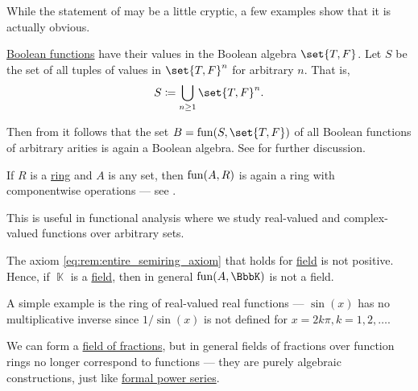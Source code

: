 \begin{example}\label{ex:thm:functions_over_model_of_positive_formulas_form_model}
  While the statement of  may be a little cryptic, a few examples show that it is actually obvious.
  \begin{itemize}
     \hyperref[def:boolean_function]{Boolean functions} have their values in the Boolean algebra \( \set{ T, F } \). Let \( S \) be the set of all tuples of values in \( \set{ T, F }^n \) for arbitrary \( n \). That is,
    \begin{equation*}
      S \coloneqq \bigcup_{n \geq 1} \set{ T, F }^n.
    \end{equation*}

    Then from  it follows that the set \( B = \fun(S, \set{ T, F }) \) of all Boolean functions of arbitrary arities is again a Boolean algebra. See  for further discussion.

     If \( R \) is a \hyperref[def:ring]{ring} and \( A \) is any set, then \( \operatorname{fun}(A, R) \) is again a ring with componentwise operations --- see .

    This is useful in functional analysis where we study real-valued and complex-valued functions over arbitrary sets.

     The axiom \eqref{eq:rem:entire_semiring_axiom} that holds for  \hyperref[def:field]{field} is not positive. Hence, if \( \BbbK \) is a \hyperref[def:field]{field}, then in general \( \fun(A, \BbbK) \) is not a field.

    A simple example is the ring of real-valued real functions --- \( \sin(x) \) has no multiplicative inverse since \( 1 / \sin(x) \) is not defined for \( x = 2k\pi, k = 1, 2, \ldots \).

    We can form a \hyperref[thm:field_of_fractions]{field of fractions}, but in general fields of fractions over function rings no longer correspond to functions --- they are purely algebraic constructions, just like \hyperref[def:formal_power_series]{formal power series}.
  \end{itemize}
\end{example}

